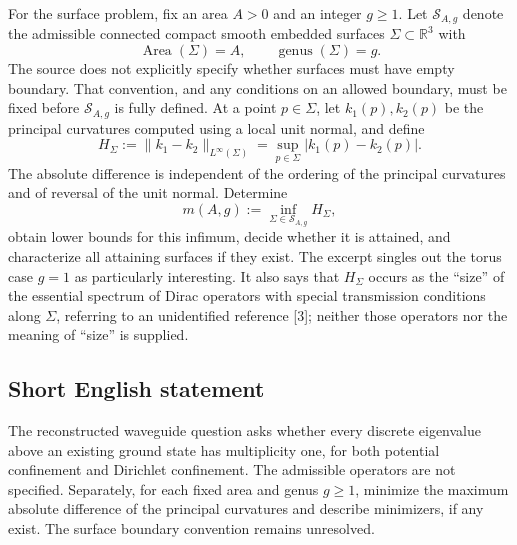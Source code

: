 \documentclass[11pt]{article}
\newcommand{\R}{\mathbb{R}}
\begin{document}
For the surface problem, fix an area \(A>0\) and an integer \(g\geq1\). Let \(\mathcal S_{A,g}\) denote the admissible connected compact smooth embedded surfaces \(\Sigma\subset\R^3\) with
\[
\operatorname{Area}(\Sigma)=A,\qquad \operatorname{genus}(\Sigma)=g.
\]
The source does not explicitly specify whether surfaces must have empty boundary. That convention, and any conditions on an allowed boundary, must be fixed before \(\mathcal S_{A,g}\) is fully defined. At a point \(p\in\Sigma\), let \(k_1(p),k_2(p)\) be the principal curvatures computed using a local unit normal, and define
\[
H_\Sigma:=\|k_1-k_2\|_{L^\infty(\Sigma)}
=\sup_{p\in\Sigma}|k_1(p)-k_2(p)|.
\]
The absolute difference is independent of the ordering of the principal curvatures and of reversal of the unit normal. Determine
\[
m(A,g):=\inf_{\Sigma\in\mathcal S_{A,g}}H_\Sigma,
\]
obtain lower bounds for this infimum, decide whether it is attained, and characterize all attaining surfaces if they exist. The excerpt singles out the torus case \(g=1\) as particularly interesting. It also says that \(H_\Sigma\) occurs as the ``size'' of the essential spectrum of Dirac operators with special transmission conditions along \(\Sigma\), referring to an unidentified reference [3]; neither those operators nor the meaning of ``size'' is supplied.
\subsection{Short English statement}
The reconstructed waveguide question asks whether every discrete eigenvalue above an existing ground state has multiplicity one, for both potential confinement and Dirichlet confinement. The admissible operators are not specified. Separately, for each fixed area and genus \(g\geq1\), minimize the maximum absolute difference of the principal curvatures and describe minimizers, if any exist. The surface boundary convention remains unresolved.
\end{document}
